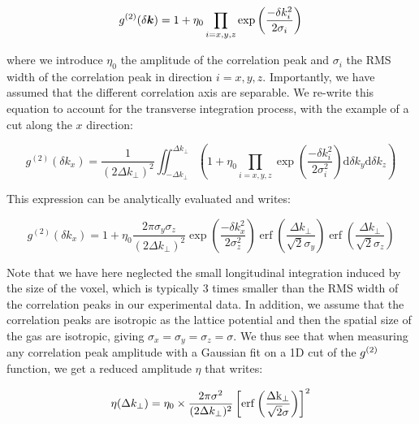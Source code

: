 \begin{equation}
    g^{(2)} (\delta \bm{k}) = 1 + \eta_0 \prod_{i=x,y,z} \exp \left(\frac{-\delta k_i^2}{2 \sigma_i}\right)
    \label{eq:g2_theo}
\end{equation}

\noindent where we introduce $\eta_0$ the amplitude of the correlation peak and $\sigma_i$ the RMS width of the correlation peak in direction $i=x,y,z$. Importantly, we have assumed that the different correlation axis are separable. We re-write this equation to account for the transverse integration process, with the example of a cut along the $x$ direction:

\begin{equation}
    g^{(2)} \left(\delta k_{x}\right)=\frac{1}{\left(2 \Delta k_{\perp}\right)^{2}} \iint_{-\Delta k_{\perp}}^{\Delta k_{\perp}} \left( 1+ \eta_0 \prod_{i=x, y, z} \exp \left(\frac{-\delta k_{i}^{2}}{2 \sigma_i^{2}}\right) \mathrm{d} \delta k_y \mathrm{d} \delta k_z \right)
\end{equation}

\noindent This expression can be analytically evaluated and writes:

\begin{equation}
    g^{(2)} \left(\delta k_{x}\right)=1+\eta_0 \frac{2 \pi \sigma_y \sigma_z}{\left(2 \Delta k_{\perp}\right)^{2}} \exp \left(\frac{-\delta k_{x}^{2}}{2 \sigma_{z}^{2}}\right) \operatorname{erf}\left(\frac{\Delta k_{\perp}}{\sqrt{2} \sigma_{y}}\right) \operatorname{erf}\left(\frac{\Delta k_{\perp}}{\sqrt{2} \sigma_{z}}\right)
\end{equation}

Note that we have here neglected the small longitudinal integration induced by the size of the voxel, which is typically 3 times smaller than the RMS width of the correlation peaks in our experimental data. In addition, we assume that the correlation peaks are isotropic as the lattice potential and then the spatial size of the gas are isotropic, giving $\sigma_x=\sigma_y=\sigma_z=\sigma$. We thus see that when measuring any correlation peak amplitude with a Gaussian fit on a 1D cut of the $g^{(2)}$ function, we get a reduced amplitude $\eta$ that writes:

\begin{equation}
    \eta (\Delta k_{\perp})= \eta_{0} \times \frac{2 \pi \sigma^2}{(2\Delta k_{\perp})^2}\left[\rm{erf} \left(\frac{\Delta k_{\perp}}{\sqrt{2}\sigma} \right)\right]^2
    \label{eq:fit_integration}
\end{equation}

